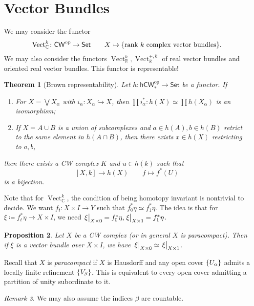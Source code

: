 \documentclass[leqno, openany]{memoir}
\newtheorem{thm}{Theorem}[section]
\newtheorem{prop}[thm]{Proposition}
\theoremstyle{definition}
\theoremstyle{remark}
\newtheorem{rmk}[thm]{Remark}
\theoremstyle{plain}
\theoremstyle{definition}
\theoremstyle{remark}
\newcommand{\R}{\mathbb{R}}
\newcommand{\C}{\mathbb{C}}
\newcommand{\mr}[1]{\mathrm{#1}}
\newcommand{\ms}[1]{\mathsf{#1}}
\DeclareMathOperator{\Vect}{Vect}
\begin{document}
\section{Vector Bundles}%

We may consider the functor \[ \mr{Vect}_{\C}^k \colon \ms{CW}^{\mr{op}} \to
\ms{Set} \qquad X \mapsto \qty{\text{rank $k$ complex vector bundles}}. \] We
may also consider the functors $\Vect_{\R}^k, \Vect_{\R}^{+, k}$ of real vector
bundles and oriented real vector bundles. This functor is representable!

\begin{thm}[Brown representability] Let $h \colon \ms{hCW}_*^{\mr{op}} \to
    \ms{Set}$ be a functor. If \begin{enumerate} \item For $X = \bigvee
        X_{\alpha}$ with $i_{\alpha} \colon X_{\alpha} \hookrightarrow X$, then
        $\prod i_{\alpha}^* \colon h(X) \simeq \prod h(X_{\alpha})$ is an
        isomorphism; \item If $X = A \cup B$ is a union of subcomplexes and $a
\in h(A), b \in h(B)$ retrict to the same element in $h(A \cap B)$, then there
exists $x \in h(X)$ restricting to $a,b$, \end{enumerate} then there exists a
CW complex $K$ and $u \in h(k)$ such that \[ [X,k] \to h(X) \qquad f \mapsto
f^*(U) \] is a bijection.  \end{thm}

Note that for $\Vect_{\C}^k$, the condition of being homotopy invariant is
nontrivial to decide. We want $f_t \colon X \times I \to Y$ such that $f_0^*
\eta \simeq f_1^* \eta$. The idea is that for $\xi \coloneqq f_t^* \eta \to X
\times I$, we need $\eval{\xi}_{X \times 0} = f_0^* \eta, \eval{\xi}_{X \times
1} = f_1^* \eta$.

\begin{prop} Let $X$ be a CW complex (or in general $X$ is paracompact). Then
if $\xi$ is a vector bundle over $X \times I$, we have $\eval{\xi}_{X \times 0}
\simeq \eval{\xi}_{X \times 1}$.  \end{prop}

Recall that $X$ is \textit{paracompact} if $X$ is Hausdorff and any open cover
$\qty{U_{\alpha}}$ admits a locally finite refinement $\qty{V_{\beta}}$. This
is equivalent to every open cover admitting a partition of unity subordinate to
it.

\begin{rmk} We may also assume the indices $\beta$ are countable.  \end{rmk}
\end{document}
